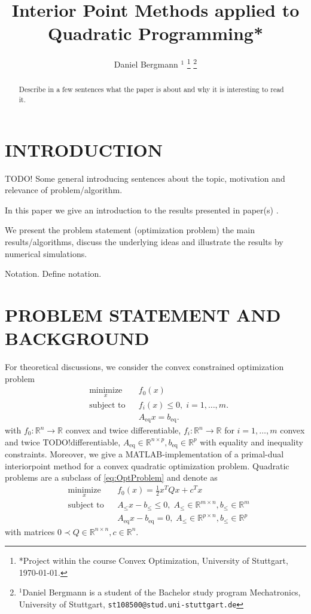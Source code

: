 \documentclass[letterpaper, 10 pt, conference]{ieeeconf}  %
\title{\LARGE \bf Interior Point Methods applied to Quadratic Programming*}
\author{Daniel Bergmann $^{1}$%
\thanks{*Project within the course Convex Optimization, University of Stuttgart, \today.}%
\thanks{$^{1}$Daniel Bergmann is a student of the Bachelor study program Mechatronics, University of Stuttgart,
        {\tt\small st108500@stud.uni-stuttgart.de}}%
}
\newcommand{\R}{\mathbb{R}}
\newcommand{\Rn}{\mathbb{R}^n}
\newcommand{\Rm}{\mathbb{R}^m}
\newcommand{\Rp}{\mathbb{R}^p}
\newcommand{\todo}{{\color{red} TODO!}}
\newcommand{\ind}[2]{{#1}_{\mathrm{#2}}}
\newcommand{\Aeq}{\ind{A}{eq}}
\newcommand{\beq}{\ind{b}{eq}}
\newcommand{\Aineq}{\ind{A}{\leq}}
\newcommand{\bineq}{\ind{b}{\leq}}
\newcommand{\trp}{^T}
\newcommand{\matlab}{MATLAB}
\newcommand{\OptProblem}{
	\begin{aligned}
	& \underset{x}{\text{minimize}}
	& & f_0(x) \\
	& \text{subject to}
	& & f_i(x) \leq 0, \; i = 1, \ldots, m.\\
	& & &\Aeq x = \beq.
	\end{aligned}
	}
\newcommand{\OptProblemquad}{
	\begin{aligned}
		& \underset{x}{\text{minimize}}
		& & f_0(x) =\frac{1}{2} x\trp Q x + c\trp x\\
		& \text{subject to}
		& & \Aineq x - \bineq \leq 0, \; \Aineq \in \R^{m\times n}, \bineq \in \Rm\\
		& & &\Aeq x - \beq = 0, \;  \Aineq \in \R^{p\times n}, \bineq \in \Rp
	\end{aligned}
}
\begin{document}
\maketitle
\thispagestyle{empty}
\pagestyle{empty}


\begin{abstract}

Describe in a few sentences what the paper is about and why it is interesting 
to read it.

\end{abstract}


\section{INTRODUCTION}
\todo
Some general introducing sentences about the topic, motivation and relevance of problem/algorithm.

In this paper we give an introduction to the results presented in paper(s) \cite{Bro-14}.



We present the problem statement (optimization problem)
the main results/algorithms, discuss the underlying ideas and illustrate the results 
by numerical simulations.

Notation. Define notation.

\section{PROBLEM STATEMENT AND BACKGROUND}
For theoretical discussions, we consider the convex constrained optimization problem
\begin{equation}
\OptProblem
\label{eq:OptProblem}
\end{equation}
with $ f_0:\Rn \longrightarrow \R $ convex and twice differentiable, $ f_i:\Rn \longrightarrow \R $ for $ i=1,\dots,m $ convex and twice \todo differentiable,
$ \Aeq \in \R^{n\times p}, \beq \in  \R^p $ with equality and inequality constraints.
Moreover, we give a \matlab-implementation of a primal-dual interiorpoint method for a convex quadratic optimization problem. Quadratic problems are a subclass of \eqref{eq:OptProblem} and denote as
\begin{equation}
	\OptProblemquad
	\label{eq:QuadProblem}
\end{equation}
with matrices $ 0 \prec Q\in \R^{n \times n}, c\in \Rn. $
\end{document}
